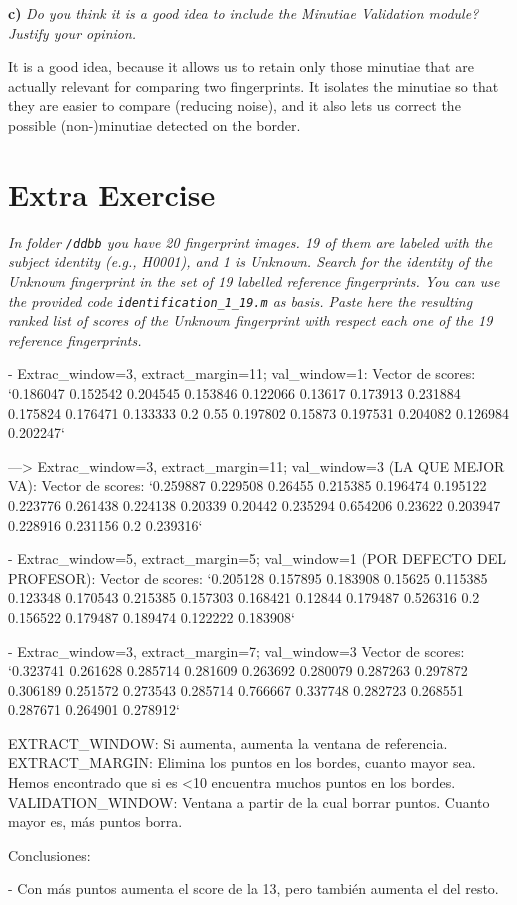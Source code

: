 \documentclass[11pt]{article}
\begin{document}
\textbf{c) }\emph{Do you think it is a good idea to include the Minutiae Validation module? Justify your opinion.}

It is a good idea, because it allows us to retain only those minutiae that are actually relevant for comparing two fingerprints. It isolates the minutiae so that they are easier to compare (reducing noise), and it also lets us correct the possible (non-)minutiae detected on the border.

\newpage
\section*{Extra Exercise}

\emph{In folder \texttt{/ddbb} you have 20 fingerprint images. 19 of them are labeled with the subject identity (e.g., H0001), and 1 is Unknown. Search for the identity of the Unknown fingerprint in the set of 19 labelled reference fingerprints. You can use the provided code \texttt{identification\_1\_19.m} as basis. Paste here the resulting ranked list of scores of the Unknown fingerprint with respect each one of the 19 reference fingerprints.}

- Extrac_window=3, extract_margin=11; val_window=1:
Vector de scores:
`0.186047 0.152542 0.204545 0.153846 0.122066 0.13617 0.173913 0.231884 0.175824 0.176471 0.133333 0.2 0.55 0.197802 0.15873 0.197531 0.204082 0.126984 0.202247`

---> Extrac_window=3, extract_margin=11; val_window=3 (LA QUE MEJOR VA):
Vector de scores:
`0.259887 0.229508 0.26455 0.215385 0.196474 0.195122 0.223776 0.261438 0.224138 0.20339 0.20442 0.235294 0.654206 0.23622 0.203947 0.228916 0.231156 0.2 0.239316`

- Extrac_window=5, extract_margin=5; val_window=1 (POR DEFECTO DEL PROFESOR):
Vector de scores:
`0.205128 0.157895 0.183908 0.15625 0.115385 0.123348 0.170543 0.215385 0.157303 0.168421 0.12844 0.179487 0.526316 0.2 0.156522 0.179487 0.189474 0.122222 0.183908`

- Extrac_window=3, extract_margin=7; val_window=3
Vector de scores:
`0.323741 0.261628 0.285714 0.281609 0.263692 0.280079 0.287263 0.297872 0.306189 0.251572 0.273543 0.285714 0.766667 0.337748 0.282723 0.268551 0.287671 0.264901 0.278912`

EXTRACT_WINDOW: Si aumenta, aumenta la ventana de referencia.
EXTRACT_MARGIN: Elimina los puntos en los bordes, cuanto mayor sea. Hemos encontrado que si es <10 encuentra muchos puntos en los bordes.
VALIDATION_WINDOW: Ventana a partir de la cual borrar puntos. Cuanto mayor es, más puntos borra.


Conclusiones:

- Con más puntos aumenta el score de la 13, pero también aumenta el del resto.
\end{document}
